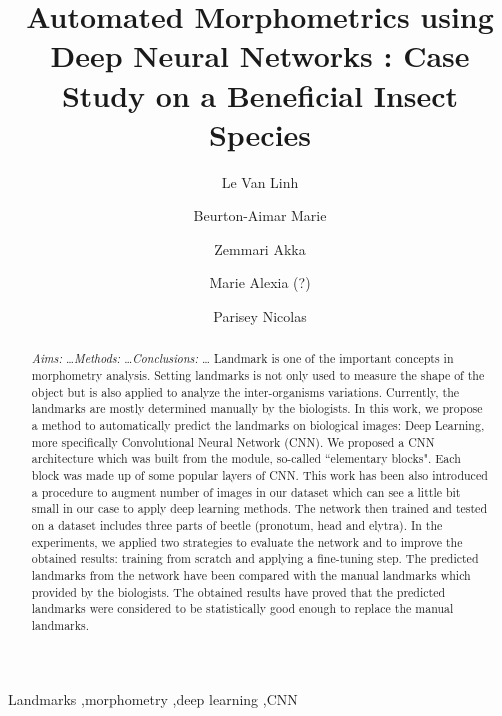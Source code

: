 \documentclass[review]{elsarticle}
\begin{document}
\begin{frontmatter}

  \title{Automated Morphometrics using Deep Neural Networks : Case Study on a Beneficial Insect Species}




\author[labri,itdlu]{Le Van Linh}
\author[labri]{Beurton-Aimar Marie}
\author[labri]{Zemmari Akka}
\author[igepp]{Marie Alexia (?)}
\author[igepp]{Parisey Nicolas}


\address[igepp]{UMR 1349 IGEPP, BP 35327, 35653 Le Rheu, France}

\address[labri]{University of Bordeaux, 351, cours de la Libération, 33405 Talence}
\address[itdlu]{Dalat University, Dalat, Lamdong, Vietnam}


\begin{abstract}
\textit{Aims:} \ldots \textit{Methods:} \ldots \textit{Conclusions:} \ldots
Landmark is one of the important concepts in morphometry analysis. Setting landmarks is not only used to measure the shape of the object but is also applied to analyze the inter-organisms variations. Currently, the landmarks are mostly determined manually by the biologists.
In this work, we propose a method to automatically predict the landmarks on biological images: Deep Learning, more specifically Convolutional Neural Network (CNN). We proposed a CNN architecture which was built from the module, so-called ``elementary blocks". Each block was made up of some popular layers of CNN. This work has been also introduced a procedure to augment number of images in our dataset which can see a little bit small in our case to apply deep learning methods. 
The network then trained and tested on a dataset includes three parts of beetle (pronotum, head and elytra). In the experiments, we applied two strategies to evaluate the network and to improve the obtained results: training from scratch and applying a fine-tuning step. The predicted landmarks from the network have been compared with the manual landmarks which provided by the biologists. The obtained results have proved that the predicted landmarks were considered to be statistically good enough to replace the manual landmarks.
\end{abstract}

\begin{keyword}
Landmarks \sep morphometry \sep deep learning \sep CNN
\end{keyword}

\end{frontmatter}
\end{document}
